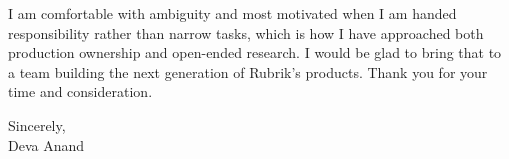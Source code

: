 \documentclass[letterpaper,11pt]{article}
\begin{document}
I am comfortable with ambiguity and most motivated when I am handed responsibility rather than narrow tasks, which is how I have approached both production ownership and open-ended research. I would be glad to bring that to a team building the next generation of Rubrik's products. Thank you for your time and consideration.

\vspace{4pt}

Sincerely, \\
Deva Anand
\end{document}
